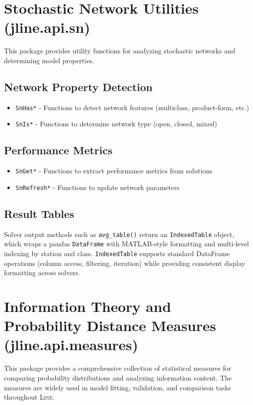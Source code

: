 \section{Stochastic Network Utilities (jline.api.sn)}

This package provides utility functions for analyzing stochastic networks and determining model properties.

\subsection{Network Property Detection}
\begin{itemize}
\item \texttt{SnHas*} - Functions to detect network features (multiclass, product-form, etc.)
\item \texttt{SnIs*} - Functions to determine network type (open, closed, mixed)
\end{itemize}

\subsection{Performance Metrics}
\begin{itemize}
\item \texttt{SnGet*} - Functions to extract performance metrics from solutions
\item \texttt{SnRefresh*} - Functions to update network parameters
\end{itemize}

\subsection{Result Tables}
\begin{PYTHON}
Solver output methods such as \texttt{avg\_table()} return an \texttt{IndexedTable} object, which wraps a pandas \texttt{DataFrame} with MATLAB-style formatting and multi-level indexing by station and class. \texttt{IndexedTable} supports standard DataFrame operations (column access, filtering, iteration) while providing consistent display formatting across solvers.
\end{PYTHON}

\section{Information Theory and Probability Distance Measures (jline.api.measures)}

This package provides a comprehensive collection of statistical measures for comparing probability distributions and analyzing information content. The measures are widely used in model fitting, validation, and comparison tasks throughout \textsc{Line}.

